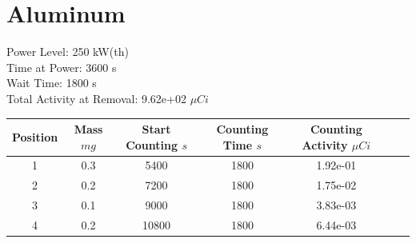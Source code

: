 \newpage

\section*{ Aluminum }

Power Level: 250 kW(th) \\
Time at Power: 3600 s \\
Wait Time: 1800 s \\
Total Activity at Removal: 9.62e+02 $\mu Ci$

\begin{table}[h]
\centering
\begin{tabular}{ |c|c|c|c|c|c|c| }
 \hline
 Position & Mass $mg$ & Start Counting $s$ & Counting Time $s$ & Counting Activity $\mu Ci$ \\
 \hline 
 1 & 0.3 & 5400 & 1800 & 1.92e-01\\ 
\hline
 2 & 0.2 & 7200 & 1800 & 1.75e-02\\ 
\hline
 3 & 0.1 & 9000 & 1800 & 3.83e-03\\ 
\hline
 4 & 0.2 & 10800 & 1800 & 6.44e-03\\ 
\hline
\end{tabular}
\end{table}

